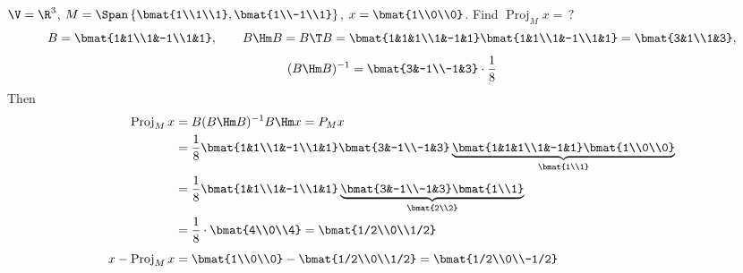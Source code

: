 \begin{example}
$\V=\R^3$, \quad $M = \Span\left\{\bmat{1\\1\\1},\bmat{1\\-1\\1}\right\}$, \quad
$x = \bmat{1\\0\\0}$. \quad Find $\operatorname{Proj}_M x = \,?$
\begin{gather*}
B = \bmat{1&1\\1&-1\\1&1}, \qquad
B\Hm B = B\T B = \bmat{1&1&1\\1&-1&1}\bmat{1&1\\1&-1\\1&1} = \bmat{3&1\\1&3},\\[4pt]
(B\Hm B)^{-1} = \bmat{3&-1\\-1&3}\cdot\frac18
\end{gather*}
Then
\begin{align*}
\operatorname{Proj}_M x &= B(B\Hm B)^{-1}B\Hm x = P_M x\\
&= \frac18\bmat{1&1\\1&-1\\1&1}\bmat{3&-1\\-1&3}\underbrace{\bmat{1&1&1\\1&-1&1}\bmat{1\\0\\0}}_{\bmat{1\\1}}\\
&= \frac18\bmat{1&1\\1&-1\\1&1}\underbrace{\bmat{3&-1\\-1&3}\bmat{1\\1}}_{\bmat{2\\2}}\\
&= \frac18\cdot\bmat{4\\0\\4} = \bmat{1/2\\0\\1/2}\\[4pt]
x-\operatorname{Proj}_M x &= \bmat{1\\0\\0} - \bmat{1/2\\0\\1/2} = \bmat{1/2\\0\\-1/2}
\end{align*}

\end{example}
